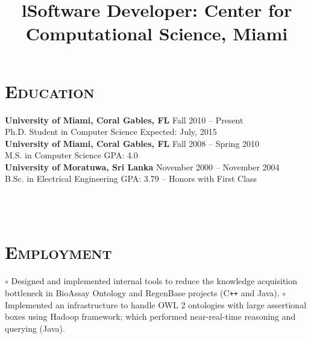 \begin{resume}



\vspace{-5mm}
\section{\textsc{Education}}

\textbf{University of Miami, Coral Gables, FL} \hfill Fall 2010 -- Present \\
Ph.D. Student in Computer Science \hfill Expected: July, 2015 \\
\newline
\textbf{University of Miami, Coral Gables, FL} \hfill Fall 2008 -- Spring 2010 \\
M.S. in Computer Science \hfill GPA: 4.0 \\
\newline
\textbf{University of Moratuwa, Sri Lanka} \hfill November 2000 -- November 2004 \\ 
B.Sc. in Electrical Engineering \hfill GPA: 3.79 -- Honors with
First Class




\begin{formatb}
  \title{l}\\
  \body\\
\end{formatb}

\vspace{-2mm}
\section{\textsc{Employment}}

\title{\textbf{Software Developer:  Center for Computational Science, Miami}}
\begin{position}
$\circ$ Designed and implemented internal tools  to reduce the knowledge acquisition bottleneck  
in  BioAssay Ontology and RegenBase projects (C\texttt{++} and Java). \newline
$\circ$ Implemented an infrastructure to handle OWL 2 ontologies with large assertional 
boxes using Hadoop framework; which performed near-real-time reasoning and querying (Java). 
\end{position}


\end{resume}
